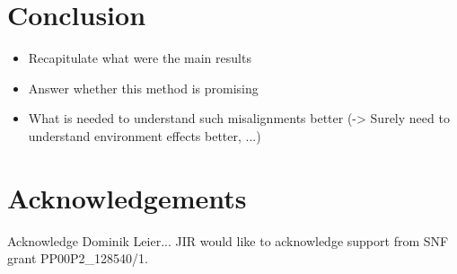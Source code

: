 \documentclass[useAMS,usenatbib]{mn2e}
\begin{document}
\section{Conclusion}
\begin{itemize}
\item Recapitulate what were the main results
\item Answer whether this method is promising
\item What is needed to understand such misalignments better (-> Surely need to understand environment effects better, ...)
\end{itemize}

\section{Acknowledgements}
Acknowledge Dominik Leier...
JIR would like to acknowledge support from SNF grant PP00P2\_128540/1.



\end{document}
